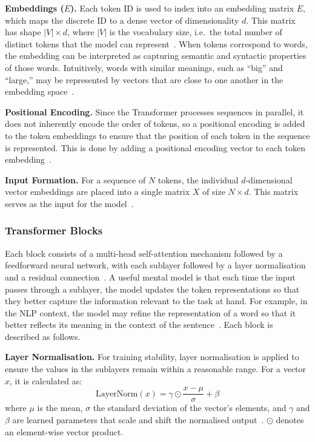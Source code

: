﻿\documentclass[12pt,a4paper]{article}
\let\oldcite\cite
\renewcommand{\cite}[1]{\mbox{\oldcite{#1}}}
\theoremstyle{definition}
\begin{document}
\textbf{\small Embeddings ($E$).} Each token ID is used to index into an embedding matrix $E$, which maps 
the discrete ID to a dense vector of dimensionality $d$. This matrix has shape $|V| \times d$, where $|V|$ is 
the vocabulary size, i.e.\ the total number of distinct tokens that the model can represent~\cite{jurafsky2026speech}.
When tokens correspond to words, the embedding can be interpreted as capturing semantic and syntactic properties of 
those words. Intuitively, words with similar meanings, such as ``big'' and ``large,'' may be represented by vectors 
that are close to one another in the embedding space~\cite{jurafsky2026speech}.

\textbf{\small Positional Encoding.} Since the Transformer processes sequences in parallel, it does not 
inherently encode the order of tokens, so a positional encoding is added to the token embeddings to ensure that the 
position of each token in the sequence is represented. This is done by adding a positional encoding vector to each
token embedding~\cite{jurafsky2026speech}.

\textbf{\small Input Formation.} For a sequence of $N$ tokens, the individual $d$-dimensional vector embeddings are 
placed into a single matrix $X$ of size $N \times d$. This matrix serves as the input for the model~\cite{jurafsky2026speech}.

\subsubsection{Transformer Blocks}

Each block consists of a multi-head self-attention mechanism followed by a feedforward neural network, with each sublayer
followed by a layer normalisation and a residual connection~\cite{jurafsky2026speech}. 
A useful mental model is that each time the input passes through a sublayer, the model 
updates the token representations so that they better capture the information relevant to 
the task at hand. For example, in the NLP context, the model may refine the representation of a 
word so that it better reflects its meaning in the context of the sentence~\cite{jurafsky2026speech}.
Each block is described as follows.

\textbf{\small Layer Normalisation.} For training stability, layer normalisation is applied to ensure the values in the sublayers remain within a reasonable range.
For a vector $x$, it is calculated as:
\begin{equation}
\mathrm{LayerNorm}(x) = \gamma \odot \frac{x - \mu}{\sigma} + \beta
\end{equation}
where $\mu$ is the mean, $\sigma$ the standard deviation of the vector's elements, and $\gamma$ and $\beta$ are 
learned parameters that scale and shift the normalised output~\cite{jurafsky2026speech}. $\odot$ denotes an element-wise
vector product.
\end{document}
